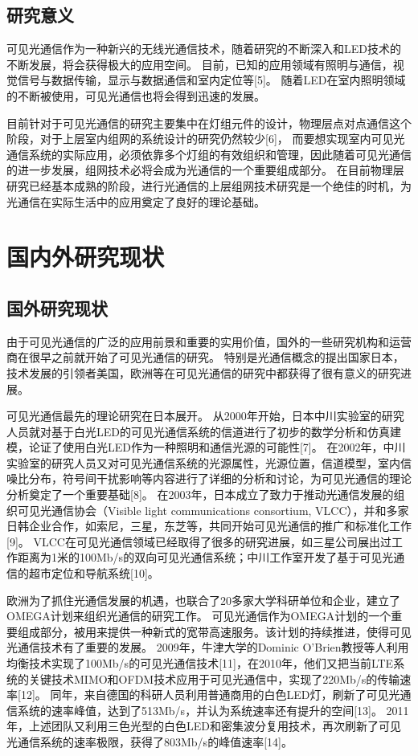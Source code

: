 \subsection{研究意义}
可见光通信作为一种新兴的无线光通信技术，随着研究的不断深入和LED技术的不断发展，将会获得极大的应用空间。
目前，已知的应用领域有照明与通信，视觉信号与数据传输，显示与数据通信和室内定位等[5]。
随着LED在室内照明领域的不断被使用，可见光通信也将会得到迅速的发展。

目前针对于可见光通信的研究主要集中在灯组元件的设计，物理层点对点通信这个阶段，对于上层室内组网的系统设计的研究仍然较少[6]，
而要想实现室内可见光通信系统的实际应用，必须依靠多个灯组的有效组织和管理，因此随着可见光通信的进一步发展，组网技术必将会成为光通信的一个重要组成部分。
在目前物理层研究已经基本成熟的阶段，进行光通信的上层组网技术研究是一个绝佳的时机，为光通信在实际生活中的应用奠定了良好的理论基础。

\section{国内外研究现状}\label{sec:stage}
\subsection{国外研究现状}
由于可见光通信的广泛的应用前景和重要的实用价值，国外的一些研究机构和运营商在很早之前就开始了可见光通信的研究。
特别是光通信概念的提出国家日本，技术发展的引领者美国，欧洲等在可见光通信的研究中都获得了很有意义的研究进展。

可见光通信最先的理论研究在日本展开。
从2000年开始，日本中川实验室的研究人员就对基于白光LED的可见光通信系统的信道进行了初步的数学分析和仿真建模，论证了使用白光LED作为一种照明和通信光源的可能性[7]。
在2002年，中川实验室的研究人员又对可见光通信系统的光源属性，光源位置，信道模型，室内信噪比分布，符号间干扰影响等内容进行了详细的分析和讨论，为可见光通信的理论分析奠定了一个重要基础[8]。
在2003年，日本成立了致力于推动光通信发展的组织可见光通信协会（Visible light communications consortium, VLCC），并和多家日韩企业合作，如索尼，三星，东芝等，共同开始可见光通信的推广和标准化工作[9]。
VLCC在可见光通信领域已经取得了很多的研究进展，如三星公司展出过工作距离为1米的100Mb/s的双向可见光通信系统；中川工作室开发了基于可见光通信的超市定位和导航系统[10]。

欧洲为了抓住光通信发展的机遇，也联合了20多家大学科研单位和企业，建立了OMEGA计划来组织光通信的研究工作。
可见光通信作为OMEGA计划的一个重要组成部分，被用来提供一种新式的宽带高速服务。该计划的持续推进，使得可见光通信技术有了重要的发展。
2009年，牛津大学的Dominic O'Brien教授等人利用均衡技术实现了100Mb/s的可见光通信技术[11]，在2010年，他们又把当前LTE系统的关键技术MIMO和OFDM技术应用于可见光通信中，实现了220Mb/s的传输速率[12]。
同年，来自德国的科研人员利用普通商用的白色LED灯，刷新了可见光通信系统的速率峰值，达到了513Mb/s，并认为系统速率还有提升的空间[13]。
2011年，上述团队又利用三色光型的白色LED和密集波分复用技术，再次刷新了可见光通信系统的速率极限，获得了803Mb/s的峰值速率[14]。

